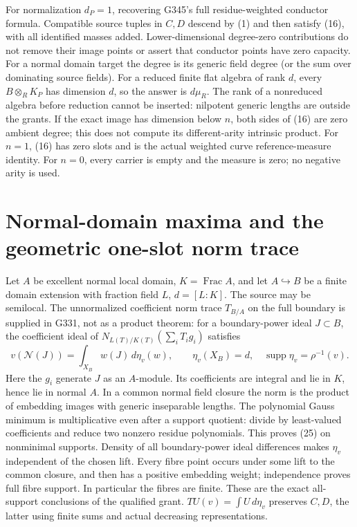 For normalization \(d_P=1\), recovering G345's full
residue-weighted conductor formula. Compatible source tuples
in \(C,D\) descend by (1) and then satisfy (16), with all
identified masses added. Lower-dimensional degree-zero
contributions do not remove their image points or assert
that conductor points have zero capacity.
For a normal domain target the degree is its generic field
degree (or the sum over dominating source fields).
For a reduced finite flat algebra of rank \(d\), every
\(B\otimes_R K_P\) has dimension \(d\), so the answer is
\(d\mu_R\). The rank of a nonreduced algebra before reduction
cannot be inserted: nilpotent generic lengths are outside
the grants.
If the exact image has dimension below \(n\), both sides of
(16) are zero ambient degree; this does not compute its
different-arity intrinsic product.
For \(n=1\), (16) has zero slots and is the actual weighted
curve reference-measure identity. For \(n=0\), every carrier
is empty and the measure is zero; no negative arity is used.

\section{Normal-domain maxima and the geometric one-slot norm trace}
\label{sec:normal}
Let \(A\) be excellent normal local domain, \(K=\operatorname{Frac}A\),
and let \(A\hookrightarrow B\) be a finite domain extension with
fraction field \(L\), \(d=[L:K]\). The source may be semilocal.
The unnormalized coefficient norm trace \(T_{B/A}\) on the full
boundary is supplied in G331, not as a product theorem:
for a boundary-power ideal \(J\subset B\), the coefficient ideal
of \(N_{L(T)/K(T)}(\sum_iT_i g_i)\) satisfies
\[
 v(\mathcal N(J))=\int_{X_B}w(J)\,d\eta_v(w),\qquad
 \eta_v(X_B)=d,\quad\operatorname{supp}\eta_v=\rho^{-1}(v).
                                                               \tag{25}
\]
Here the \(g_i\) generate \(J\) as an \(A\)-module. Its coefficients
are integral and lie in \(K\), hence lie in normal \(A\).
In a common normal field closure the norm is the product of
embedding images with generic inseparable lengths.
The polynomial Gauss minimum is multiplicative even after a
support quotient: divide by least-valued coefficients and
reduce two nonzero residue polynomials. This proves (25)
on nonminimal supports. Density of all boundary-power ideal
differences makes \(\eta_v\) independent of the chosen lift.
Every fibre point occurs under some lift to the common closure,
and then has a positive embedding weight; independence proves
full fibre support. In particular the fibres are finite.
These are the exact all-support conclusions of the qualified
grant. \(TU(v)=\int U\,d\eta_v\) preserves \(C,D\), the latter
using finite sums and actual decreasing representations.

